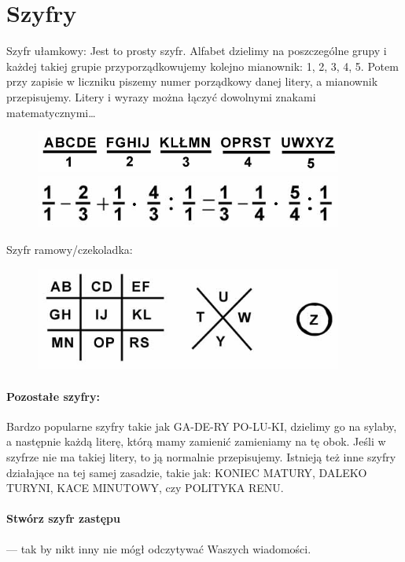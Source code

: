 \section{Szyfry}

Szyfr ułamkowy:
Jest to prosty szyfr. Alfabet dzielimy na poszczególne grupy i każdej takiej grupie przyporządkowujemy kolejno mianownik: 1, 2, 3, 4, 5. Potem przy zapisie w liczniku piszemy numer porządkowy danej litery, a mianownik przepisujemy. Litery i wyrazy można łączyć dowolnymi znakami matematycznymi\ldots
\begin{figure}[h]
\begin{center}
\includegraphics[width=0.9\textwidth]{grafiki/ulamkowy1.png}
\includegraphics[width=0.9\textwidth]{grafiki/ulamkowy2.png}
\end{center}
\end{figure}



Szyfr ramowy/czekoladka:
\begin{figure}[h]
\begin{center}
\includegraphics[width=0.9\textwidth]{grafiki/czekoladka.png}
\end{center}
\end{figure}

\paragraph{Pozostałe szyfry:}
Bardzo popularne szyfry takie jak GA-DE-RY PO-LU-KI, dzielimy go na sylaby, a następnie każdą literę, którą mamy zamienić zamieniamy na tę obok. Jeśli w szyfrze nie ma takiej litery, to ją normalnie przepisujemy. Istnieją też inne szyfry działające na tej samej zasadzie, takie jak: KONIEC MATURY, DALEKO TURYNI, KACE MINUTOWY, czy POLITYKA RENU.

\paragraph{Stwórz szyfr zastępu} --- tak by nikt inny nie mógł odczytywać Waszych wiadomości.





